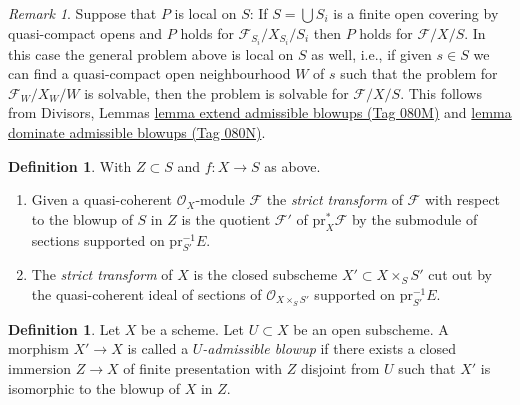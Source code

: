 \documentclass{amsart}
\theoremstyle{plain}
\theoremstyle{definition}
\newtheorem{definition}[subsection]{Definition}
\theoremstyle{remark}
\newtheorem{remark}[subsection]{Remark}
\numberwithin{equation}{subsection}
\begin{document}
\begin{remark}
\medskip\noindent
Suppose that $P$ is local on $S$: If $S = \bigcup S_i$ is a finite open
covering by quasi-compact opens and $P$ holds for
$\mathcal{F}_{S_i}/X_{S_i}/S_i$ then $P$ holds for $\mathcal{F}/X/S$.
In this case the general problem above is local on $S$ as well, i.e.,
if given $s \in S$ we can find a quasi-compact open neighbourhood $W$ of $s$
such that the problem for $\mathcal{F}_W/X_W/W$ is solvable, then the
problem is solvable for $\mathcal{F}/X/S$. This follows from
Divisors, Lemmas \href{https://stacks.math.columbia.edu/tag/080M}{lemma extend admissible blowups (Tag 080M)} and
\href{https://stacks.math.columbia.edu/tag/080N}{lemma dominate admissible blowups (Tag 080N)}.
\end{remark}

\begin{definition}
\label{divisors-definition-strict-transform}
With $Z \subset S$ and $f : X \to S$ as above.
\begin{enumerate}
\item Given a quasi-coherent $\mathcal{O}_X$-module $\mathcal{F}$
the {\it strict transform} of $\mathcal{F}$ with respect to the blowup
of $S$ in $Z$ is the quotient $\mathcal{F}'$ of $\text{pr}_X^*\mathcal{F}$
by the submodule of sections supported on $\text{pr}_{S'}^{-1}E$.
\item The {\it strict transform} of $X$ is the closed subscheme
$X' \subset X \times_S S'$ cut out by the quasi-coherent ideal of
sections of $\mathcal{O}_{X \times_S S'}$ supported on $\text{pr}_{S'}^{-1}E$.
\end{enumerate}
\end{definition}

\begin{definition}
\label{divisors-definition-admissible-blowup}
Let $X$ be a scheme. Let $U \subset X$ be an open subscheme. A morphism
$X' \to X$ is called a {\it $U$-admissible blowup} if there exists a
closed immersion $Z \to X$ of finite presentation with $Z$ disjoint from
$U$ such that $X'$ is isomorphic to the blowup of $X$ in $Z$.
\end{definition}
\end{document}
